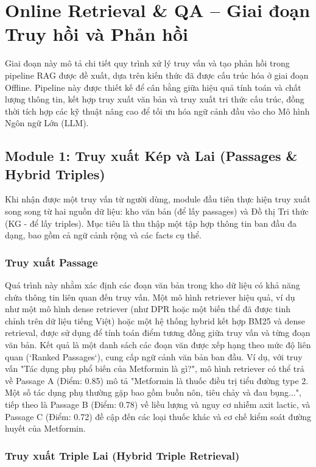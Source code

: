 \documentclass[../main.tex]{subfiles}
\begin{document}
\section{Online Retrieval \& QA – Giai đoạn Truy hồi và Phản hồi}

Giai đoạn này mô tả chi tiết quy trình xử lý truy vấn và tạo phản hồi trong pipeline RAG được đề xuất, dựa trên kiến thức đã được cấu trúc hóa ở giai đoạn Offline. Pipeline này được thiết kế để cân bằng giữa hiệu quả tính toán và chất lượng thông tin, kết hợp truy xuất văn bản và truy xuất tri thức cấu trúc, đồng thời tích hợp các kỹ thuật nâng cao để tối ưu hóa ngữ cảnh đầu vào cho Mô hình Ngôn ngữ Lớn (LLM).

\subsection{Module 1: Truy xuất Kép và Lai (Passages \& Hybrid Triples)}

Khi nhận được một truy vấn từ người dùng, module đầu tiên thực hiện truy xuất song song từ hai nguồn dữ liệu: kho văn bản (để lấy passages) và Đồ thị Tri thức (KG - để lấy triples). Mục tiêu là thu thập một tập hợp thông tin ban đầu đa dạng, bao gồm cả ngữ cảnh rộng và các facts cụ thể.

\subsubsection{Truy xuất Passage}

Quá trình này nhằm xác định các đoạn văn bản trong kho dữ liệu có khả năng chứa thông tin liên quan đến truy vấn. Một mô hình retriever hiệu quả, ví dụ như một mô hình dense retriever (như DPR hoặc một biến thể đã được tinh chỉnh trên dữ liệu tiếng Việt) hoặc một hệ thống hybrid kết hợp BM25 và dense retrieval, được sử dụng để tính toán điểm tương đồng giữa truy vấn và từng đoạn văn bản. Kết quả là một danh sách các đoạn văn được xếp hạng theo mức độ liên quan (`Ranked Passages`), cung cấp ngữ cảnh văn bản ban đầu. Ví dụ, với truy vấn "Tác dụng phụ phổ biến của Metformin là gì?", mô hình retriever có thể trả về Passage A (Điểm: 0.85) mô tả "Metformin là thuốc điều trị tiểu đường type 2. Một số tác dụng phụ thường gặp bao gồm buồn nôn, tiêu chảy và đau bụng...", tiếp theo là Passage B (Điểm: 0.78) về liều lượng và nguy cơ nhiễm axit lactic, và Passage C (Điểm: 0.72) đề cập đến các loại thuốc khác và cơ chế kiểm soát đường huyết của Metformin.

\subsubsection{Truy xuất Triple Lai (Hybrid Triple Retrieval)}
\end{document}

